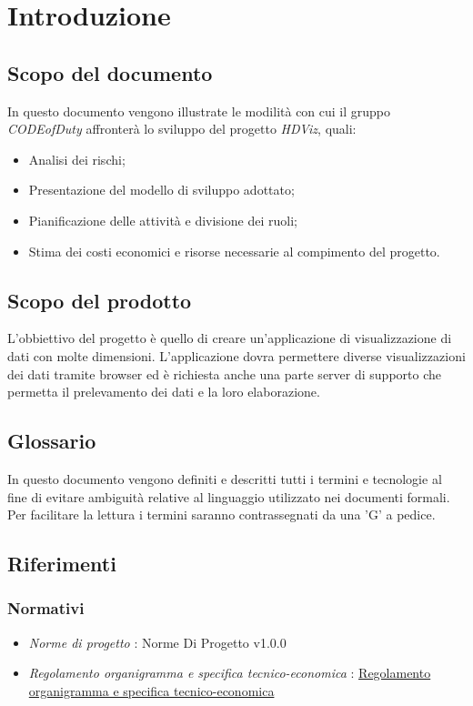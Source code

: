 \section{Introduzione}
\subsection{Scopo del documento}
	In questo documento vengono illustrate le modilità con cui il gruppo \emph{CODEofDuty} affronterà lo sviluppo del progetto \emph{HDViz}, quali:
	\begin{itemize}
    		\item Analisi dei rischi;
    		\item Presentazione del modello di sviluppo adottato;
    		\item Pianificazione delle attività e divisione dei ruoli;
    		\item Stima dei costi economici e risorse necessarie al compimento del progetto.
	\end{itemize}
\subsection{Scopo del prodotto}
	L'obbiettivo del progetto è quello di creare un'applicazione di visualizzazione di dati con molte dimensioni. L'applicazione dovra permettere diverse visualizzazioni dei dati tramite browser ed è richiesta anche una parte server di supporto che permetta il prelevamento dei dati e la loro elaborazione.
\subsection{Glossario}
	In questo documento vengono definiti e descritti tutti i termini e tecnologie al fine di evitare ambiguità relative al linguaggio utilizzato nei documenti formali. Per facilitare la lettura i termini saranno contrassegnati da una 'G' a pedice.  
\subsection{Riferimenti}
	\subsubsection{Normativi}
		\begin{itemize}
    		\item \emph{Norme di progetto} : Norme Di Progetto v1.0.0
    		\item \emph{Regolamento organigramma e specifica tecnico-economica} : \href{https://www.math.unipd.it/~tullio/IS-1/2020/Progetto/RO.html}{Regolamento organigramma e specifica tecnico-economica}
	\end{itemize}
